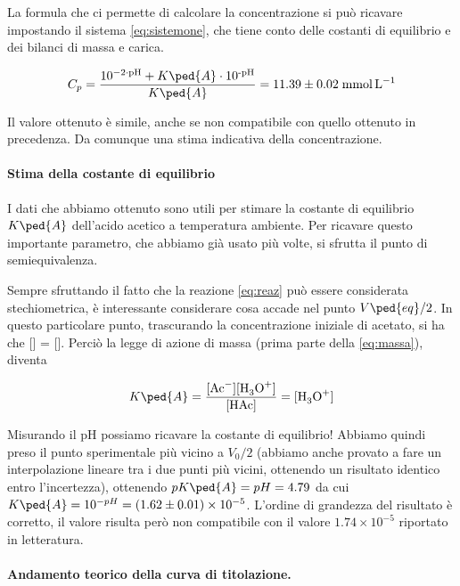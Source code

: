 La formula che ci permette di calcolare la concentrazione si può ricavare impostando il sistema \eqref{eq:sistemone},
che tiene conto delle costanti di equilibrio e dei bilanci di massa e carica.

\begin{equation}
    C_p = \frac{10^{-2 \cdot \text{pH}} + K\ped{A} \cdot 10^\text{-pH}}{K\ped{A}} = 11.39 \pm 0.02 \; \si{\milli\mol\per\litre}
\end{equation}

Il valore ottenuto è simile, anche se non compatibile con quello ottenuto in precedenza. Da comunque una stima indicativa
della concentrazione.

\paragraph{Stima della costante di equilibrio}

I dati che abbiamo ottenuto sono utili per stimare la costante di equilibrio $K\ped{A}$ dell'acido
acetico a temperatura ambiente. Per ricavare questo importante parametro, che abbiamo già usato più
volte, si sfrutta il punto di semiequivalenza.

Sempre sfruttando il fatto che la reazione \eqref{eq:reaz} può essere considerata stechiometrica,
è interessante considerare cosa accade nel punto $V\ped{eq}/2$. In questo particolare punto,
trascurando la concentrazione iniziale di acetato, si ha che [] = [].
Perciò la legge di azione di massa (prima parte della \eqref{eq:massa}), diventa 

\begin{equation}
    K\ped{A} = \frac{[\ce{Ac-}][\ce{H3O+}]}{[\ce{HAc}]} = [\ce{H3O+}]
\end{equation}

Misurando il pH possiamo ricavare la costante di equilibrio! Abbiamo quindi preso il punto sperimentale
più vicino a $V_0/2$ (abbiamo anche provato a fare un interpolazione lineare tra i due punti più
vicini, ottenendo un risultato identico entro l'incertezza), ottenendo $pK\ped{A} = pH = 4.79$ da cui
$K\ped{A} = 10^{-pH} = (1.62 \pm 0.01) \times 10^{-5}$. L'ordine di grandezza del risultato è corretto, il valore
risulta però non compatibile con il valore $1.74 \times 10^{-5}$ riportato in letteratura.

\paragraph{Andamento teorico della curva di titolazione.}

